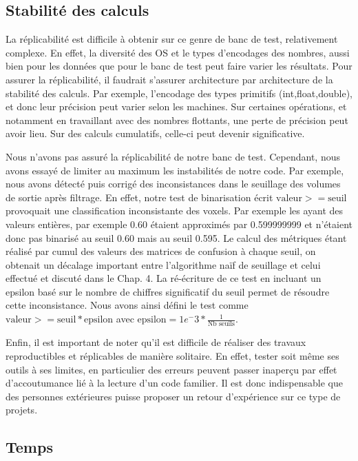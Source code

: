 \subsection{Stabilité des calculs} 

La réplicabilité est difficile à obtenir sur ce genre de banc de test, relativement complexe. En effet, la diversité des OS et le types d'encodages des nombres, aussi bien pour les données que pour le banc de test peut faire varier les résultats. Pour assurer la réplicabilité, il faudrait s'assurer architecture par architecture de la stabilité des calculs. Par exemple, l'encodage des types primitifs (int,float,double), et donc leur précision peut varier selon les machines. Sur certaines opérations, et notamment en travaillant avec des nombres flottants, une perte de précision peut avoir lieu. Sur des calculs cumulatifs, celle-ci peut devenir significative.

Nous n'avons pas assuré la réplicabilité de notre banc de test. Cependant, nous avons essayé de limiter au maximum les instabilités de notre code. Par exemple, nous avons détecté puis corrigé des inconsistances dans le seuillage des volumes de sortie après filtrage. En effet, notre test de binarisation écrit $\text{valeur} >= \text{seuil}$ provoquait une classification inconsistante des voxels. Par exemple les ayant des valeurs entières, par exemple 0.60 étaient approximés par 0.599999999 et n'étaient donc pas binarisé au seuil 0.60 mais au seuil 0.595. Le calcul des métriques étant réalisé par cumul des valeurs des matrices de confusion à chaque seuil, on obtenait un décalage important entre l'algorithme naïf de seuillage et celui effectué et discuté dans le Chap. 4. La ré-écriture de ce test en incluant un epsilon basé sur le nombre de chiffres significatif du seuil permet de résoudre cette inconsistance. Nous avons ainsi défini le test comme $ \text{valeur} >= \text{seuil} * \text{epsilon} $ avec $\text{epsilon} = 1e^-3 * \frac{1}{ \text{Nb seuils} }$.

Enfin, il est important de noter qu'il est difficile de réaliser des travaux reproductibles et réplicables de manière solitaire. En effet, tester soit même ses outils à ses limites, en particulier des erreurs peuvent passer inaperçu par effet d'accoutumance lié à la lecture d'un code familier. Il est donc indispensable que des personnes extérieures puisse proposer un retour d'expérience sur ce type de projets.

\subsection{Temps}

